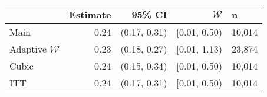 \begin{tabular}{lrrrl}
  \hline
 & Estimate & 95\% CI & $\mathcal{W}$ & n \\ 
  \hline
Main & 0.24 & (0.17, 0.31) & [0.01, 0.50) & 10,014 \\ 
  Adaptive $\mathcal{W}$ & 0.23 & (0.18, 0.27) & [0.01, 1.13) & 23,874 \\ 
  Cubic & 0.24 & (0.15, 0.34) & [0.01, 0.50) & 10,014 \\ 
  ITT & 0.24 & (0.17, 0.31) & [0.01, 0.50) & 10,014 \\ 
   \hline
\end{tabular}
